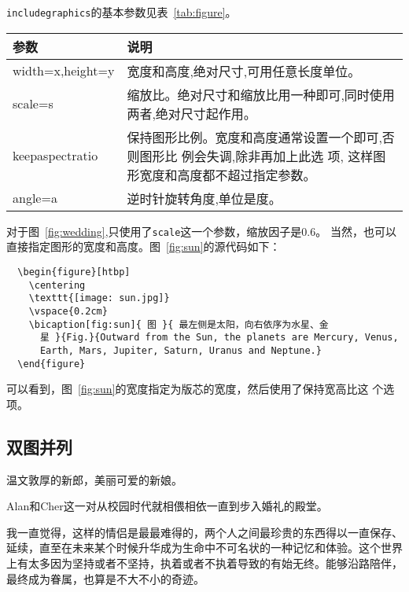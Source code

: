 \texttt{includegraphics}的基本参数见表~\ref{tab:figure}。

\begin{table}[htbp]
  \centering
  \vspace{0.2cm}
  \begin{tabularx}{0.8\textwidth{}}{lX}
    \toprule
    参数             & 说明 \\
    \midrule
    width=x,height=y & 宽度和高度,绝对尺寸,可用任意长度单位。                           \\
    scale=s          & 缩放比。绝对尺寸和缩放比用一种即可,同时使用两者,绝对尺寸起作用。 \\
    keepaspectratio & 保持图形比例。宽度和高度通常设置一个即可,否则图形比
    例会失调,除非再加上此选 项,
    这样图形宽度和高度都不超过指定参数。                                                \\
    angle=a          & 逆时针旋转角度,单位是度。                                        \\
    \bottomrule
  \end{tabularx}
\end{table}

对于图~\ref{fig:wedding},只使用了\texttt{scale}这一个参数，缩放因子是0.6。
当然，也可以直接指定图形的宽度和高度。图~\ref{fig:sun}的源代码如下：

\begin{lstlisting}
  \begin{figure}[htbp]
    \centering
    \texttt{[image: sun.jpg]}
    \vspace{0.2cm}
    \bicaption[fig:sun]{ 图 }{ 最左侧是太阳，向右依序为水星、金
      星 }{Fig.}{Outward from the Sun, the planets are Mercury, Venus,
      Earth, Mars, Jupiter, Saturn, Uranus and Neptune.}
  \end{figure}
\end{lstlisting}

可以看到，图~\ref{fig:sun}的宽度指定为版芯的宽度，然后使用了保持宽高比这
个选项。


\subsection{双图并列}

温文敦厚的新郎，美丽可爱的新娘。

Alan和Cher这一对从校园时代就相偎相依一直到步入婚礼的殿堂。

我一直觉得，这样的情侣是最最难得的，两个人之间最珍贵的东西得以一直保存、
延续，直至在未来某个时候升华成为生命中不可名状的一种记忆和体验。这个世界
上有太多因为坚持或者不坚持，执着或者不执着导致的有始无终。能够沿路陪伴，
最终成为眷属，也算是不大不小的奇迹。

